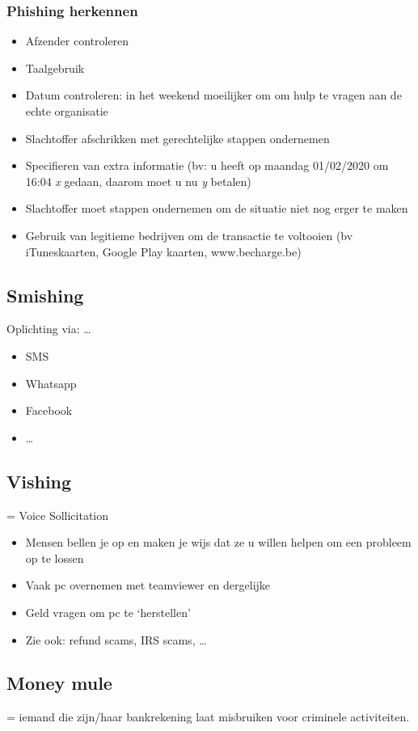 \documentclass{article}
\begin{document}
\subsubsection{Phishing herkennen}
\begin{itemize}
    \item Afzender controleren
    \item Taalgebruik
    \item Datum controleren: in het weekend moeilijker om om hulp te vragen aan de echte organisatie 
    \item Slachtoffer afschrikken met gerechtelijke stappen ondernemen
    \item Specifieren van extra informatie (bv: u heeft op maandag 01/02/2020 om 16:04 \textit{x} gedaan, daarom moet u nu \textit{y} betalen)
    \item Slachtoffer moet stappen ondernemen om de situatie niet nog erger te maken
    \item Gebruik van legitieme bedrijven om de transactie te voltooien (bv iTuneskaarten, Google Play kaarten, www.becharge.be)
\end{itemize}


\subsection{Smishing}
Oplichting via: \dots
\begin{itemize}
    \item SMS
    \item Whatsapp
    \item Facebook
    \item \dots
\end{itemize}

\subsection{Vishing}
= Voice Sollicitation 

\begin{itemize}
    \item Mensen bellen je op en maken je wijs dat ze u willen helpen om een probleem op te lossen
    \item Vaak pc overnemen met teamviewer en dergelijke
    \item Geld vragen om pc te `herstellen'
    \item Zie ook: refund scams, IRS scams, \dots
\end{itemize}

\subsection{Money mule}
= iemand die zijn/haar bankrekening laat misbruiken voor criminele activiteiten. 
\end{document}

